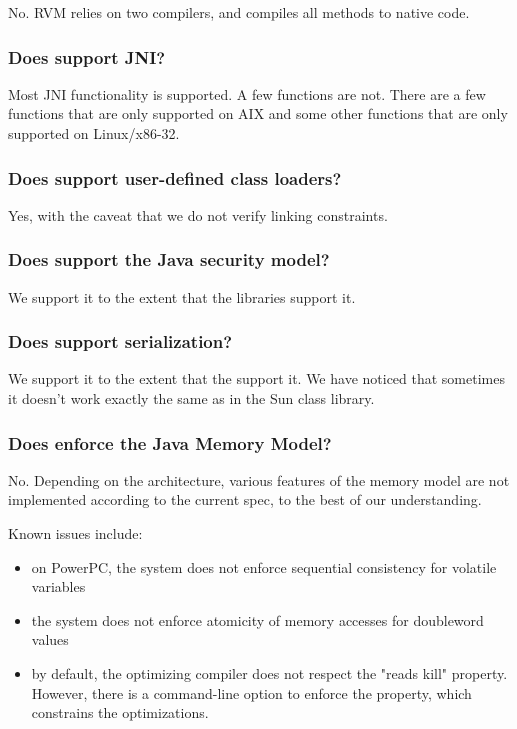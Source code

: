 No.  RVM relies on two compilers, and compiles all methods to native code.

\subsubsection{Does \jrvm{} support JNI?}

Most JNI functionality is supported. A few functions are not. 
There are a few functions that are only supported on AIX\TMweb{}
and some other functions that are only supported on Linux\Rweb{}/x86-32.

\subsubsection{Does \jrvm{} support user-defined class loaders?}
Yes, with the caveat that we do not verify linking constraints.

\subsubsection{Does \jrvm{} support the Java\TMheadingweb{} security model?} 

We support it to the extent that the 
libraries support it.

\subsubsection{Does \jrvm{} support serialization?}

We support it to the extent that the 
support it. We have noticed that sometimes it doesn't
work exactly the same as in the Sun\Rweb{} class library.

\subsubsection{Does \jrvm{} enforce the Java Memory Model?}

No. Depending on the architecture, various features of the memory model
are not implemented according to the current spec, to the best of our
understanding.

Known issues include:
\begin{itemize}
\item on PowerPC\TMweb{}, the system does not enforce
sequential consistency for volatile variables
\item the system does not enforce atomicity of memory accesses for
doubleword values
\item by default, the optimizing compiler does not respect the "reads
kill" property.  However, there is a command-line option to enforce the
property, which constrains the optimizations.
\end{itemize}

